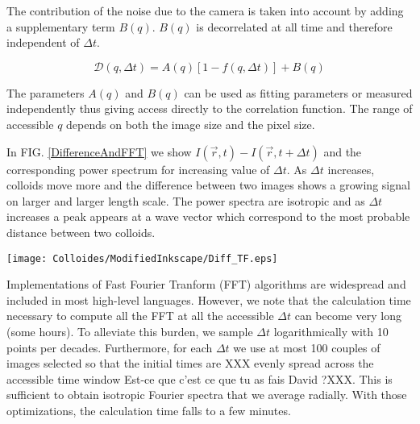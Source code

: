 \documentclass[%
 aip,
 jmp,%
 amsmath,amssymb,
reprint,%
]{revtex4-1}
\begin{document}
The contribution of the noise due to the camera is taken into account by adding a supplementary term $B(q)$. $B(q)$ is decorrelated  at all time and therefore independent of $\Delta t$.

\begin{equation}
\mathcal{D}(q,\Delta t) = A(q)\left[1-f(q, \Delta t)\right] + B(q)
\label{eq:D2f}
\end{equation}

The parameters $A(q)$ and $B(q)$ can be used as fitting parameters or measured independently thus giving access directly to the correlation function. The range of accessible $q$ depends on both the image size and the pixel size.

In FIG. \ref{DifferenceAndFFT} we show $I(\vec{r}, t)- I(\vec{r}, t+\Delta t)$ and the corresponding power spectrum for increasing value of $\Delta t$. As $\Delta t$ increases, colloids move more and the difference between two images shows a growing signal on larger and larger length scale. The power spectra are isotropic and as $\Delta t$ increases a peak appears at a wave vector which correspond to the most probable distance between two colloids.

\begin{figure*}
\texttt{[image: Colloides/ModifiedInkscape/Diff\_TF.eps]}
\caption{Image differences of a colloidal suspension and their Fourier transform as a function of $\Delta t$. (a, b, c) Differences between 2 images separated by $\Delta t$. (d, e, f) 2D Fourier transforms of those differences. These differences and Fourier transforms are calculated with $\Delta t = 0.01$ s (a, d), $\Delta t = 1$ s (b, e), $\Delta t = 100$ s (c, f). The unit of the Fourier transforms is arbitrary.}
\label{DifferenceAndFFT}
\end{figure*}

Implementations of Fast Fourier Tranform (FFT) algorithms are widespread and included in most high-level languages. However, we note that the calculation time necessary to compute all the FFT at all the accessible $\Delta t$ can become very long (some hours). To alleviate this burden, we sample $\Delta t$ logarithmically with 10 points per decades. Furthermore, for each $\Delta t$ we use at most 100 couples of images selected so that the initial times are XXX evenly spread across the accessible time window  Est-ce que c'est ce que tu as fais David ?XXX. This is sufficient to obtain isotropic Fourier spectra that we average radially. With those optimizations, the calculation time falls to a few minutes.
\end{document}
